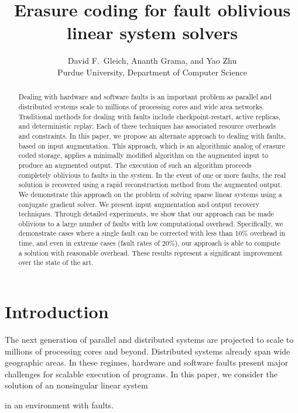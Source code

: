 \documentclass[11pt]{article}
\title{Erasure coding for fault oblivious linear system solvers}
\author{David F.~Gleich, Ananth Grama, and Yao Zhu\\
Purdue University, Department of Computer Science}
\makeatletter
\def\blfootnote{\xdef\@thefnmark{}\@footnotetext}
\makeatother
\begin{document}
\date{}
\maketitle

\blfootnote{~}
\begin{abstract} 
Dealing with hardware and software faults is an important problem
as parallel and distributed systems scale to millions of processing cores
and wide area networks. Traditional methods for dealing with faults include
checkpoint-restart, active replicas, and deterministic replay. Each of these
techniques has associated resource overheads and constraints. In this paper, we
propose an alternate approach to dealing with faults, based on input augmentation.
This approach, which is an algorithmic analog of erasure coded storage, applies a
minimally modified algorithm on the augmented input to produce an augmented output.
The execution of such an algorithm proceeds completely oblivious to faults
in the system. In the event of one or more faults, the real solution is recovered
using a rapid reconstruction method from the augmented output. We demonstrate this
approach on the problem of solving sparse linear systems using a conjugate gradient
solver. We present input augmentation and output recovery techniques. Through detailed
experiments, we show that our approach can be made oblivious to a large number of
faults with low computational overhead. Specifically, we demonstrate cases where
a single fault can be corrected with less than 10\% overhead in time, and 
even in extreme cases (fault rates of 20\%), our approach is able to compute a solution
with reasonable overhead. These results represent a significant improvement over
the state of the art.
\end{abstract}

\section{Introduction}

The next generation of parallel and distributed systems are projected to scale to
millions of processing cores and beyond. Distributed systems already span wide
geographic areas. In these regimes, hardware and software faults present major
challenges for scalable execution of programs. In this paper, we consider the
solution of an  nonsingular linear system

in an environment with faults.
\end{document}
